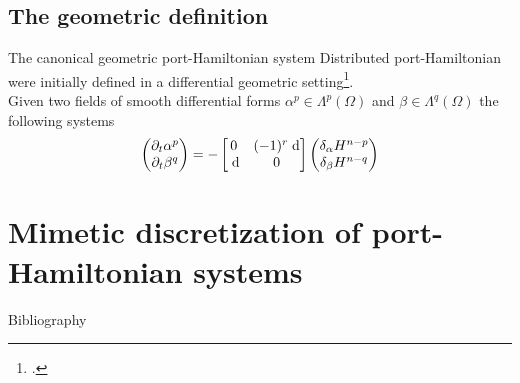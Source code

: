 \documentclass[aspectratio=169]{beamer}
\begin{document}
\subsection{The geometric definition}


\begin{frame}{The canonical geometric port-Hamiltonian system}
	Distributed port-Hamiltonian were initially defined in a differential geometric setting\footcite{vanderSchaft2002}.\\
	
	Given two fields  of smooth differential forms $\alpha^p \in \Lambda^p(\Omega)$ and $\beta \in \Lambda^q(\Omega)$ the following systems
	\begin{equation*}
		\begin{pmatrix}
			\partial_t \alpha^p \\
			\partial_t \beta^q\\
		\end{pmatrix} = 
		-\begin{bmatrix}
			0 & (-1)^r\d \\
			\d & 0 \\
		\end{bmatrix}
		\begin{pmatrix}
			\delta_{\alpha} H^{n-p}\\
			\delta_{\beta} H^{n-q}\\
		\end{pmatrix}
	\end{equation*}


\end{frame}


\section{Mimetic discretization of port-Hamiltonian systems}
	
\begin{frame}{Bibliography}
	\nocite{*}
	\printbibliography
\end{frame}

	\appendix
	
	
	
	
\end{document}
